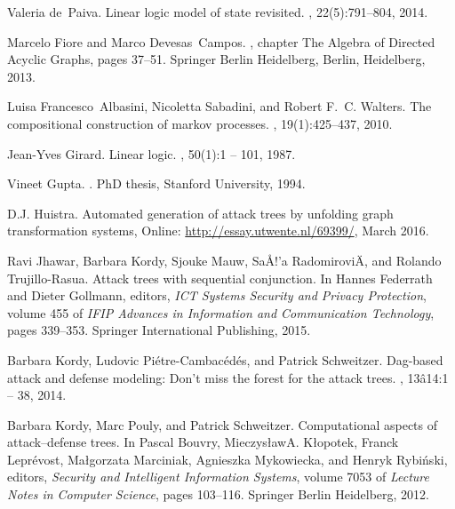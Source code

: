 \documentclass{sigplanconf}
\begin{document}
\begin{thebibliography}{10}
Valeria de~Paiva.
\newblock Linear logic model of state revisited.
, 22(5):791--804, 2014.

Marcelo Fiore and Marco Devesas~Campos.
, chapter The Algebra of Directed Acyclic
  Graphs, pages 37--51.
\newblock Springer Berlin Heidelberg, Berlin, Heidelberg, 2013.

Luisa Francesco~Albasini, Nicoletta Sabadini, and Robert F.~C. Walters.
\newblock The compositional construction of markov processes.
, 19(1):425--437, 2010.

Jean-Yves Girard.
\newblock Linear logic.
, 50(1):1 -- 101, 1987.

Vineet Gupta.
.
\newblock PhD thesis, Stanford University, 1994.

D.J. {Huistra}.
\newblock Automated generation of attack trees by unfolding graph
  transformation systems, Online: \url{http://essay.utwente.nl/69399/}, March 2016.

Ravi Jhawar, Barbara Kordy, Sjouke Mauw, Sa{\AA}{!'}a Radomirovi{\"A}, and
  Rolando Trujillo-Rasua.
\newblock Attack trees with sequential conjunction.
\newblock In Hannes Federrath and Dieter Gollmann, editors, {\em ICT Systems
  Security and Privacy Protection}, volume 455 of {\em IFIP Advances in
  Information and Communication Technology}, pages 339--353. Springer
  International Publishing, 2015.

Barbara Kordy, Ludovic Pi{\'e}tre-Cambac{\'e}d{\'e}s, and Patrick Schweitzer.
\newblock Dag-based attack and defense modeling: Don't miss the forest for the
  attack trees.
, 13{\^a}14:1 -- 38, 2014.

Barbara Kordy, Marc Pouly, and Patrick Schweitzer.
\newblock Computational aspects of attack--defense trees.
\newblock In Pascal Bouvry, Mieczys{\l}awA. K{\l}opotek, Franck Lepr{\'e}vost,
  Ma{\l}gorzata Marciniak, Agnieszka Mykowiecka, and Henryk Rybi{\'n}ski,
  editors, {\em Security and Intelligent Information Systems}, volume 7053 of
  {\em Lecture Notes in Computer Science}, pages 103--116. Springer Berlin
  Heidelberg, 2012.


\end{thebibliography}
\end{document}
